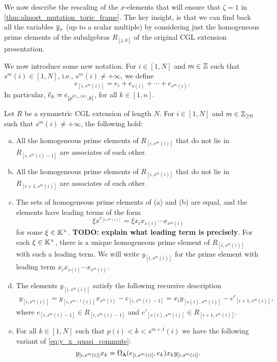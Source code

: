 We now describe the rescaling of the $x$-elements that will ensure that $\zeta = 1$ in
\cref{thm:almost_mutation_toric_frame}. The key insight, is that we can find back all
the variables $\overline{y}_{\tau}$ (up to a scalar multiple) by considering just the
homogeneous prime elements of the subalgebras $R_{[j, k]}$ of the original CGL
extension presentation.

We now introduce some new notation. For $i \in [1, N]$ and $m \in \mathbb{Z}$ such that
$s^m(i)\in [1, N]$, i.e., $s^m(i) \neq + \infty$, we define
\begin{equation*}
	e_{[i, s^m(i)]} = e_i + e_{s(i)} + \cdots + e_{s^m(i)}.
\end{equation*}
In particular, $\overline{e}_k = e_{[p^{O_{-}(k)}, k]}$, for all $k \in [1, n]$.
\begin{theorem}\label{thm:y_square_brackets}
	Let $R$ be a symmetric CGL extension of length $N$. For $i\in [1, N]$ and $m \in \mathbb{Z}_{\geq 0}$ such that $s^m(i) \neq + \infty$, the following hold:
	\begin{enumerate}[(a)]
		\item All the homogeneous prime elements of $R_{[i, s^m(i)]}$ that do not lie in $R_{[i,
							      s^m(i)-1]}$ are associates of each other.
		\item All the homogeneous prime elements of $R_{[i, s^m(i)]}$ that do not lie in $R_{[i+1,
							      s^m(i)]}$ are associates of each other.
		\item The sets of homogeneous prime elements of \textrm{(a)} and \textrm{(b)} are equal, and
		      the elements have leading terms of the form
		      \begin{equation*}
			      \xi x^{e_{[i, s^m(i)]}} = \xi x_i x_{s(i)}\cdots x_{s^m(i)}
		      \end{equation*}
		      for some $\xi \in \mathbb{K}^\times$. \textbf{TODO: explain what leading term is precisely}.
		      For each $\xi \in \mathbb{K}^\times$, there is a unique homogeneous prime element of $R_{[i,
							      s^m(i)]}$ with such a leading term. We will write $y_{[i, s^m(i)]}$ for the prime
		      element with leading term $x_i x_{s(i)}\cdots x_{s^m(i)}$.
		\item The elements $y_{[i, s^m(i)]}$ satisfy the following recursive description
		      \begin{align*}
			      y_{[i, s^m(i)]} = y_{[i, s^{m-1}(i)]}x_{s^m (i)} - c_{[i, s^m(i) -1]} = x_i y_{[s(i), s^m(i)]} - c'_{[i+1, s^m(i)]},
		      \end{align*}
		      where $c_{[i, s^m(i) -1]} \in R_{[i, s^m(i) - 1]}$ and $c'_{[s(i), s^m(i)]} \in
			      R_{[i+1, s^m(i)]}$.
		\item For all $k \in [1, N]$ such that $p(i) < k < s^{m+1}(i)$ we have the following variant
		      of \cref{eq:y_x_quasi_commute}:
		      \begin{equation*}
			      y_{[i, s^m(i)]}x_k = \Omega_{\boldsymbol{\lambda}}(e_{[i, s^m(i)]}, e_k)x_k y_{[i, s^m(i)]}.
		      \end{equation*}
	\end{enumerate}
\end{theorem}
